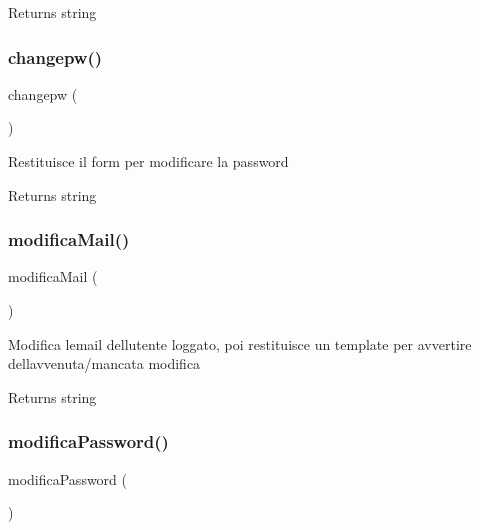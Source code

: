 \begin{DoxyReturn}{Returns}
string 
\end{DoxyReturn}
\mbox{\label{class_c_utente_a8b06e08492800ad20e31dc9066cf0839}} 
\subsubsection{\texorpdfstring{changepw()}{changepw()}}
{\footnotesize\ttfamily changepw (\begin{DoxyParamCaption}{ }\end{DoxyParamCaption})}

Restituisce il form per modificare la password

\begin{DoxyReturn}{Returns}
string 
\end{DoxyReturn}
\mbox{\label{class_c_utente_a7090c2a3eb07813b3a5c163bf470f2fe}} 
\subsubsection{\texorpdfstring{modifica\+Mail()}{modificaMail()}}
{\footnotesize\ttfamily modifica\+Mail (\begin{DoxyParamCaption}{ }\end{DoxyParamCaption})}

Modifica l\textquotesingle{}email dell\textquotesingle{}utente loggato, poi restituisce un template per avvertire dell\textquotesingle{}avvenuta/mancata modifica

\begin{DoxyReturn}{Returns}
string 
\end{DoxyReturn}
\mbox{\label{class_c_utente_af3fc2d0291f11cc62479a15fa6167266}} 
\subsubsection{\texorpdfstring{modifica\+Password()}{modificaPassword()}}
{\footnotesize\ttfamily modifica\+Password (\begin{DoxyParamCaption}{ }\end{DoxyParamCaption})}

